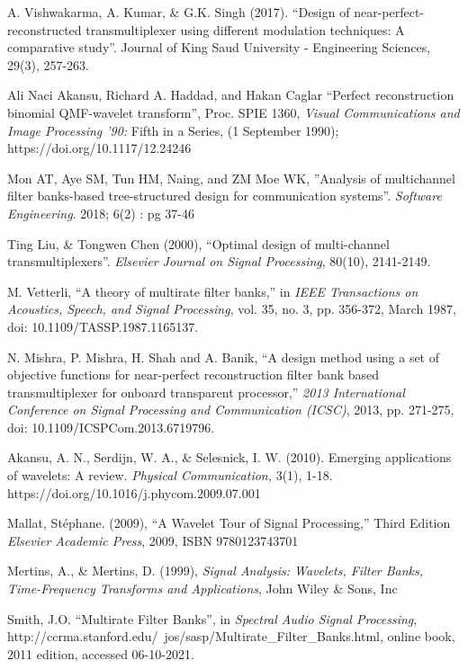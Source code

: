 \begin{thebibliography}{}
A. Vishwakarma, A. Kumar, \& G.K. Singh (2017). ``Design of near-perfect-reconstructed transmultiplexer using different modulation techniques: A comparative study''. Journal of King Saud University - Engineering Sciences, 29(3), 257-263.

Ali Naci Akansu, Richard A. Haddad, and Hakan Caglar ``Perfect reconstruction binomial QMF-wavelet transform'', Proc. SPIE 1360, \textit{Visual Communications and Image Processing '90:} Fifth in a Series, (1 September 1990); https://doi.org/10.1117/12.24246

Mon AT, Aye SM, Tun HM, Naing, and ZM Moe WK, ”Analysis of multichannel filter banks-based tree-structured design for communication systems”. \textit{Software Engineering}. 2018; 6(2) : pg 37-46

Ting Liu, \& Tongwen Chen (2000), ``Optimal design of multi-channel transmultiplexers''. \textit{Elsevier Journal on Signal Processing}, 80(10), 2141-2149.

M. Vetterli, ``A theory of multirate filter banks,'' in \textit{IEEE Transactions on Acoustics, Speech, and Signal Processing}, vol. 35, no. 3, pp. 356-372, March 1987, doi: 10.1109/TASSP.1987.1165137.

N. Mishra, P. Mishra, H. Shah and A. Banik, ``A design method using a set of objective functions for near-perfect reconstruction filter bank based transmultiplexer for onboard transparent processor,'' \textit{2013 International Conference on Signal Processing and Communication (ICSC)}, 2013, pp. 271-275, doi: 10.1109/ICSPCom.2013.6719796.

Akansu, A. N., Serdijn, W. A., \& Selesnick, I. W. (2010). Emerging applications of wavelets: A review. \textit{Physical Communication,} 3(1), 1-18. https://doi.org/10.1016/j.phycom.2009.07.001

Mallat, Stéphane. (2009), ``A Wavelet Tour of Signal Processing,'' Third Edition \textit{Elsevier Academic Press}, 2009, ISBN 9780123743701

Mertins, A., \& Mertins, D. (1999), \textit{Signal Analysis: Wavelets, Filter Banks, Time-Frequency Transforms and Applications}, John Wiley \& Sons, Inc

Smith, J.O. ``Multirate Filter Banks'', in \textit{Spectral Audio Signal Processing}, http://ccrma.stanford.edu/~jos/sasp/Multirate\_Filter\_Banks.html, online book, 2011 edition, accessed 06-10-2021.


\end{thebibliography}
